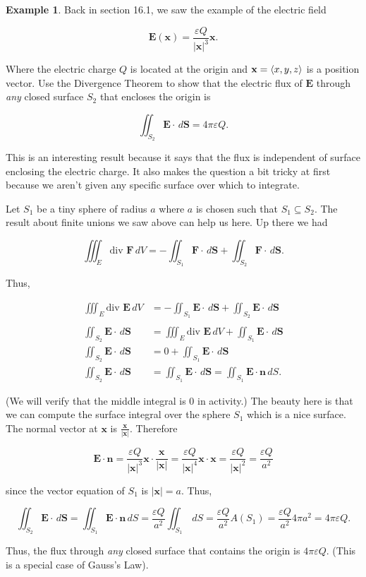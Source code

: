 \documentclass[11pt,oneside,english]{amsart}
\theoremstyle{definition}
\newtheorem*{example}{Example}
\def\<#1>{\mathinner{\langle#1\rangle}}
\begin{document}
\begin{example}
Back in section 16.1, we saw the example of the electric field

\[
\mathbf{E}(\mathbf{x})=\frac{\varepsilon Q}{|\mathbf{x}|^3}\mathbf{x}.
\]

Where the electric charge $Q$ is located at the origin and $\mathbf{x}=\<x,y,z>$ is a position vector. Use the Divergence Theorem to show that the electric flux of $\mathbf{E}$ through \textit{any} closed surface $S_2$ that encloses the origin is

\[
\iint_{S_2}\mathbf{E}\cdot\,d\mathbf{S}=4\pi\varepsilon Q.
\]

This is an interesting result because it says that the flux is independent of surface enclosing the electric charge. It also makes the question a bit tricky at first because we aren't given any specific surface over which to integrate.

Let $S_1$ be a tiny sphere of radius $a$ where $a$ is chosen such that $S_1\subseteq S_2$. The result about finite unions we saw above can help us here. Up there we had

\[
\iiint_E\text{div }\mathbf{F}\,dV=-\iint_{S_1}\mathbf{F}\cdot\,d\mathbf{S}+\iint_{S_2}\mathbf{F}\cdot\,d\mathbf{S}.
\]

Thus,

\begin{align*}
\iiint_E\text{div }\mathbf{E}\,dV&=-\iint_{S_1}\mathbf{E}\cdot\,d\mathbf{S}+\iint_{S_2}\mathbf{E}\cdot\,d\mathbf{S}\\[2mm]
\\
\iint_{S_2}\mathbf{E}\cdot\,d\mathbf{S}&=\iiint_E\text{div }\mathbf{E}\,dV+\iint_{S_1}\mathbf{E}\cdot\,d\mathbf{S}\\[2mm]
\iint_{S_2}\mathbf{E}\cdot\,d\mathbf{S}&=0+\iint_{S_1}\mathbf{E}\cdot\,d\mathbf{S}\\[2mm]
\iint_{S_2}\mathbf{E}\cdot\,d\mathbf{S}&=\iint_{S_1}\mathbf{E}\cdot\,d\mathbf{S}=\iint_{S_1}\mathbf{E}\cdot\mathbf{n}\,dS.
\end{align*}

(We will verify that the middle integral is 0 in activity.) The beauty here is that we can compute the surface integral over the sphere $S_1$ which is a nice surface. The normal vector at $\mathbf{x}$ is $\frac{\mathbf{x}}{|\mathbf{x}|}$. Therefore

\[
\mathbf{E}\cdot\mathbf{n}=\frac{\varepsilon Q}{|\mathbf{x}|^3}\mathbf{x}\cdot\frac{\mathbf{x}}{|\mathbf{x}|}=\frac{\varepsilon Q}{|\mathbf{x}|^4}\mathbf{x}\cdot\mathbf{x}=\frac{\varepsilon Q}{|\mathbf{x}|^2}=\frac{\varepsilon Q}{a^2}
\]

since the vector equation of $S_1$ is $|\mathbf{x}|=a$. Thus,

\[
\iint_{S_2}\mathbf{E}\cdot\,d\mathbf{S}=\iint_{S_1}\mathbf{E}\cdot\mathbf{n}\,dS=\frac{\varepsilon Q}{a^2}\iint_{S_1}\,dS=\frac{\varepsilon Q}{a^2}A(S_1)=\frac{\varepsilon Q}{a^2}4\pi a^2=4\pi\varepsilon Q.
\]

Thus, the flux through \textit{any} closed surface that contains the origin is $4\pi\varepsilon Q$. (This is a special case of Gauss's Law).
\end{example}
\end{document}
